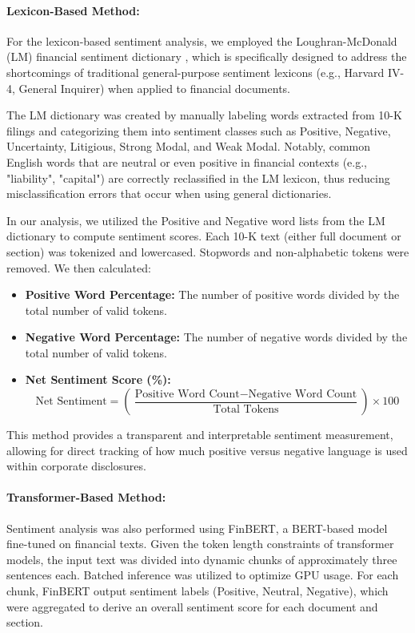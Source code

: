 \documentclass[12pt]{article}
\begin{document}
\paragraph{Lexicon-Based Method:} 
For the lexicon-based sentiment analysis, we employed the Loughran-McDonald (LM) financial sentiment dictionary \citep{Loughran2011}, which is specifically designed to address the shortcomings of traditional general-purpose sentiment lexicons (e.g., Harvard IV-4, General Inquirer) when applied to financial documents. 

The LM dictionary was created by manually labeling words extracted from 10-K filings and categorizing them into sentiment classes such as Positive, Negative, Uncertainty, Litigious, Strong Modal, and Weak Modal. Notably, common English words that are neutral or even positive in financial contexts (e.g., "liability", "capital") are correctly reclassified in the LM lexicon, thus reducing misclassification errors that occur when using general dictionaries.

In our analysis, we utilized the Positive and Negative word lists from the LM dictionary to compute sentiment scores. Each 10-K text (either full document or section) was tokenized and lowercased. Stopwords and non-alphabetic tokens were removed. We then calculated:

\begin{itemize}
    \item \textbf{Positive Word Percentage:} The number of positive words divided by the total number of valid tokens.
    \item \textbf{Negative Word Percentage:} The number of negative words divided by the total number of valid tokens.
    \item \textbf{Net Sentiment Score (\%):} \[
    \text{Net Sentiment} = \left( \frac{\text{Positive Word Count} - \text{Negative Word Count}}{\text{Total Tokens}} \right) \times 100
    \]
\end{itemize}

This method provides a transparent and interpretable sentiment measurement, allowing for direct tracking of how much positive versus negative language is used within corporate disclosures.

\paragraph{Transformer-Based Method:} Sentiment analysis was also performed using FinBERT, a BERT-based model fine-tuned on financial texts. Given the token length constraints of transformer models, the input text was divided into dynamic chunks of approximately three sentences each. Batched inference was utilized to optimize GPU usage. For each chunk, FinBERT output sentiment labels (Positive, Neutral, Negative), which were aggregated to derive an overall sentiment score for each document and section.
\end{document}
